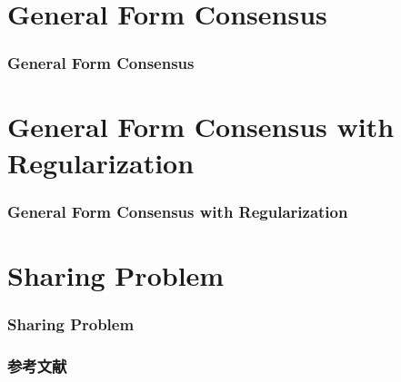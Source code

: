 \section[General Consensus]{General Form Consensus}


\begin{frame}
\frametitle{General Form Consensus}
    
\end{frame}


\section[General Consensus with Regularization]{General Form Consensus with Regularization}


\begin{frame}
\frametitle{General Form Consensus with Regularization}
    
\end{frame}


\section[Sharing Problem]{Sharing Problem}


\begin{frame}
\frametitle{Sharing Problem}

\end{frame}


\begin{frame}[allowframebreaks]
\frametitle{参考文献}

{\footnotesize


}

\end{frame}









